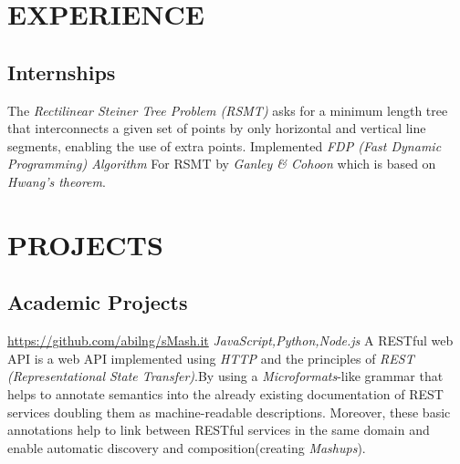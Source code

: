 \documentclass[11pt,a4paper,sans]{moderncv}
\begin{document}


\section{EXPERIENCE}
\subsection{Internships}

{The \textit{Rectilinear Steiner Tree Problem (RSMT)} asks for a minimum length tree that interconnects a given set of points by only horizontal and vertical line segments, enabling the use of extra points. Implemented \textit{ FDP (Fast Dynamic Programming) Algorithm } For RSMT by \textit{ Ganley \& Cohoon } which is based on \textit{ Hwang’s theorem}}.

\section{PROJECTS}
\subsection{Academic Projects}
{\newline \url{https://github.com/abilng/sMash.it}}{}
{\hfill \textit{JavaScript,Python,Node.js}}
{A RESTful web API is a web API implemented using \textit{HTTP }and the principles of \textit{REST (Representational State Transfer)}.By using  a \textit{Microformats}-like grammar that helps to annotate semantics into the already existing documentation of REST services doubling them as machine-readable descriptions. Moreover, these basic annotations help to link between RESTful services in the same domain and enable automatic discovery and composition(creating \textit{Mashups}).\newline}

\end{document}
